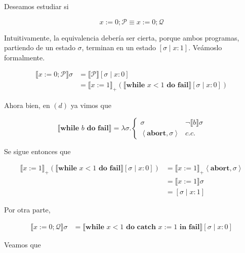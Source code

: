 \documentclass[a4paper, 12pt]{article}
\begin{document}
Deseamos estudiar si

\begin{equation*}
  x := 0; \mathcal{P} \equiv x:=0;\mathcal{Q}
\end{equation*}

Intuitivamente, la equivalencia debería ser cierta, porque ambos programas,
partiendo de un estado $\sigma$,
terminan en un estado $[\sigma \mid x : 1]$. Veámoslo formalmente.

\begin{align*}
  \llbracket x:=0;\mathcal{P} \rrbracket \sigma
  &=\llbracket \mathcal{P} \rrbracket[\sigma \mid x : 0] \\ 
  &=\llbracket x := 1 \rrbracket_{+} \left( \llbracket \textbf{while } x < 1
  \textbf{ do } \textbf{fail} \rrbracket [\sigma \mid x : 0] \right) 
\end{align*}

Ahora bien, en $(d)$ ya vimos que 

\begin{equation*}
  \llbracket \textbf{while } b \textbf{ do } \textbf{fail} \rrbracket =
  \lambda\sigma. \begin{cases}
    \sigma & \neg \llbracket b \rrbracket\sigma \\ 
    \left<\textbf{abort}, \sigma \right> & c.c.
  \end{cases}
\end{equation*}

Se sigue entonces que 

\begin{align*}
  \llbracket x := 1 \rrbracket_{+}\left( \llbracket \textbf{while } x < 1
  \textbf{ do }  \textbf{fail} \rrbracket[\sigma \mid x : 0] \right) 
  &= \llbracket x := 1 \rrbracket_+ \left<\textbf{abort}, \sigma \right> \\ 
  &= \llbracket x := 1 \rrbracket\sigma \\ 
  &=[\sigma \mid x : 1]
\end{align*}

Por otra parte, 

\begin{align*}
  \llbracket x:=0;\mathcal{Q} \rrbracket\sigma  
  &= \llbracket \textbf{while } x < 1 \textbf{ do } \textbf{catch } x := 1
  \textbf{ in fail} \rrbracket[\sigma \mid x : 0]
\end{align*}

Veamos que 
\end{document}
